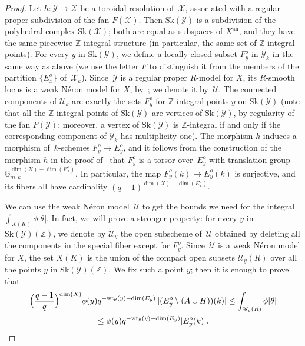 \documentclass[JEP,XML,SOM,Unicode,NoFloatCountersInSection]{cedram}
\theoremstyle{definition}
\numberwithin{equation}{subsection}
\newcommand{\Z}{\ensuremath{\mathbb{Z}}}
\newcommand{\cX}{\ensuremath{\mathscr{X}}}
\newcommand{\cU}{\ensuremath{\mathscr{U}}}
\newcommand{\cY}{\ensuremath{\mathscr{Y}}}
\newcommand{\an}{\mathrm{an}}
\newcommand{\Sk}{\mathrm{Sk}}
\newcommand{\wt}{\mathrm{wt}}
\let\form\theta
\begin{document}
\begin{proof}
Let $h\colon \cY\to \cX$ be a toroidal resolution of~$\cX$, associated with a regular proper subdivision of the fan $F(\cX)$.
Then $\Sk(\cY)$ is a subdivision of the polyhedral complex $\Sk(\cX)$; both are equal as subspaces of $X^{\an}$, and they have the same piecewise $\Z$-integral structure (in particular, the same set of $\Z$-integral points).
For every $y$ in $\Sk(\cY)$, we define a locally closed subset $F^o_y$ in $\cY_k$ in the same way as above (we use the letter $F$ to distinguish it from the members of the partition $\{E^o_x\}$ of~$\cX_k$).
Since~$\cY$ is a regular proper $R$\nobreakdash-model for $X$, its $R$\nobreakdash-smooth locus is a weak Néron model for $X$, by~\cite[3.1/2]{BLR}; we denote it by~$\cU$.
The connected components of $\cU_k$ are exactly the sets $F_y^o$ for $\Z$-integral points $y$ on $\Sk(\cY)$ (note that all the $\Z$-integral points of $\Sk(\cY)$ are vertices of $\Sk(\cY)$, by regularity of the fan $F(\cY)$; moreover, a vertex of $\Sk(\cY)$ is $\Z$-integral if and only if the corresponding component of $\cY_k$ has multiplicity one).
The morphism $h$ induces a morphism of~$k$-schemes $F^o_y\to E^o_y$, and it follows from the construction of the morphism $h$ in the
proof of~\cite[9.9]{kato} that $F^o_y$ is a torsor over~$E^o_y$ with translation group
$\mathbb{G}^{\dim(X)-\dim(E_x^o)}_{m,k}$. In particular, the map $F^o_y(k)\to E^o_y(k)$ is surjective, and its fibers all have cardinality $(q-1)^{\dim(X)-\dim(E_x^o)}$.

We can use the weak Néron model~$\cU$ to get the bounds we need for the integral $\int_{X(K)}\phi|\form|$.
In fact, we will prove a stronger property: for every $y$ in $\Sk(\cY)(\Z)$, we denote by $\cU_y$ the open subscheme of~$\cU$
obtained by deleting all the components in the special fiber except for $F^o_y$. Since~$\cU$ is a weak Néron model for $X$, the set $X(K)$ is the union of the compact open subsets $\cU_y(R)$ over all the points $y$ in $\Sk(\cY)(\Z)$. We fix such a point $y$; then it is enough to prove that
\begin{multline*}
\Bigl(\frac{q-1}{q}\Bigr)^{\dim(X)} \phi(y) q^{-\wt_{\form}(y)-\dim(E_y)}\,|(E_y^o\setminus (A\cup H))(k)| \leq \int_{\cU_y(R)}\phi|\form|
\\
\leq \phi(y)q^{-\wt_{\form}(y)-\dim(E_y)}|E_y^o(k)|.
\end{multline*}


\end{proof}
\end{document}
